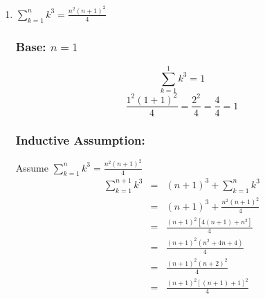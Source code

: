 \documentclass[letterpaper,12pt,fleqn]{article}
\begin{document}
\begin{theproof}
\begin{enumerate}
\item $\sum_{k=1}^nk^3=\frac{n^2(n+1)^2}{4}$
\subsubsection*{Base: $n=1$}
\[\sum_{k=1}^1k^3=1\]
\[\frac{1^2(1+1)^2}{4}=\frac{2^2}{4}=\frac{4}{4}=1\]
\subsubsection*{Inductive Assumption:}
Assume $\sum_{k=1}^nk^3=\frac{n^2(n+1)^2}{4}$
\begin{eqnarray*}
\sum_{k=1}^{n+1}k^3 &=& (n+1)^3+\sum_{k=1}^nk^3 \\
    &=& (n+1)^3+\frac{n^2(n+1)^2}{4} \\
    &=& \frac{(n+1)^2[4(n+1)+n^2]}{4} \\
    &=& \frac{(n+1)^2(n^2+4n+4)}{4} \\
    &=& \frac{(n+1)^2(n+2)^2}{4} \\
    &=& \frac{(n+1)^2[(n+1)+1]^2}{4} \\
\end{eqnarray*}
\end{enumerate}
\end{theproof}
\end{document}

